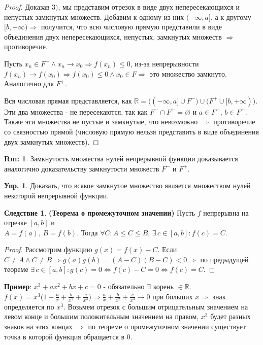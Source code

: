 \documentclass[12pt]{article}
\theoremstyle{definition}
\newtheorem{rem}{Rm:}
\newtheorem{exrc}{Упр.}
\newtheorem{corollary}{Следствие}
\begin{document}
\begin{proof}
	Доказав $3)$, мы представим отрезок в виде двух непересекающихся и непустых замкнутых множеств. Добавим к одному из них $(-\infty, a]$, а к другому $[b, +\infty) \Rightarrow$ получится, что всю числовую прямую представили в виде объединения двух непересекающихся, непустых, замкнутых множеств $\Rightarrow$ противоречие.
	
	Пусть $x_n \in F^- \wedge x_n \to x_0 \Rightarrow f(x_n) \leq 0$, из-за непрерывности $f(x_n) \to f(x_0)\Rightarrow f(x_0) \leq 0 \wedge x_0 \in F \Rightarrow$ это множество замкнуто. Аналогично для $F^+$.
	
	Вся числовая прямая представляется, как $\mathbb{R} = \big((-\infty,a] \cup F^- \big) \cup \big( F^+ \cup  [b,+\infty)\big)$. Эти два множества - не пересекаются, так как $F^- \cap F^+ = \varnothing$ и $a \in F^-, \, b \in F^+$. Также эти множества не пустые и замкнутые, что невозможно $\Rightarrow$ противоречие со связностью прямой (числовую прямую нельзя представить в виде объединения двух замкнутых множеств).
\end{proof}	

\begin{rem}
	Замкнутость множества нулей непрерывной функции доказывается аналогично доказательству замкнутости множеств $F^-$ и $F^+$.
\end{rem}

\begin{exrc}
	Доказать, что всякое замкнутое множество является множеством нулей некоторой непрерывной функции.
\end{exrc}

\begin{corollary}\textbf{(Теорема о промежуточном значении)}
	Пусть $f$ непрерывна на отрезке $[a,b]$ и \\
	$A = f(a), \, B = f(b)$. Тогда $\forall C \colon A \leq C \leq B, \, \exists \, c\in [a,b] \colon f(c) = C$.
\end{corollary}

\begin{proof}
	Рассмотрим функцию $g(x) = f(x) - C$. Если $C \neq A \wedge C \neq B \Rightarrow g(a)g(b) = (A - C)(B - C) < 0 \Rightarrow$ по предыдущей теореме $\exists \, c \in [a,b] \colon g(c) = 0 \Leftrightarrow f(c) - C = 0 \Leftrightarrow f(c) = C$.
\end{proof}

\textbf{Пример}: $x^3 + ax^2 + bx + c =0$ - обязательно $\exists$ корень $\in \mathbb{R}$. 
$f(x) = x^3\big(1 + \tfrac{a}{x} + \tfrac{b}{x^2} + \tfrac{c}{x^3}\big) \Rightarrow \tfrac{a}{x} + \tfrac{b}{x^2} + \tfrac{c}{x^3} \to 0$ при больших $x \Rightarrow$ знак определяется по $x^3$. Возьмем отрезок с большим отрицательным значением на левом конце и большим положительным значением на правом, $x^3$ будет разных знаков на этих концах $\Rightarrow$ по теореме о промежуточном значении существует точка в которой функция обращается в 0.
\end{document}
